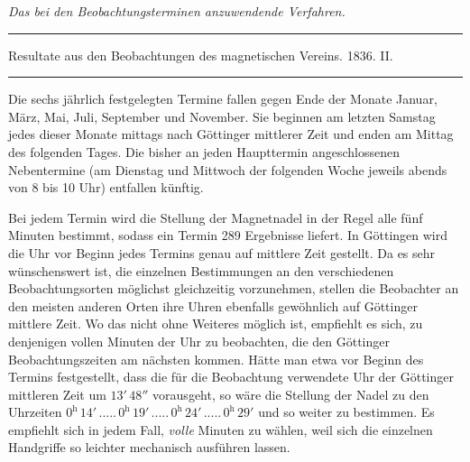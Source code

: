 \begin{center}
{\large\itshape Das bei den Beobachtungsterminen anzuwendende Verfahren.\par}
\vspace{5mm}\hrule\vspace{2mm}
{\small Resultate aus den Beobachtungen des magnetischen Vereins. 1836. II.\par}
\vspace{2mm}\hrule\vspace{5mm}
\end{center}
Die sechs jährlich festgelegten Termine fallen gegen Ende der Monate Januar, März, Mai, Juli, September und November. Sie beginnen am letzten Samstag jedes dieser Monate mittags nach Göttinger mittlerer Zeit und enden am Mittag des folgenden Tages. Die bisher an jeden Haupttermin angeschlossenen Nebentermine (am Dienstag und Mittwoch der folgenden Woche jeweils abends von 8 bis 10 Uhr) entfallen künftig.

Bei jedem Termin wird die Stellung der Magnetnadel in der Regel alle fünf Minuten bestimmt, sodass ein Termin 289 Ergebnisse liefert. In Göttingen wird die Uhr vor Beginn jedes Termins genau auf mittlere Zeit gestellt. Da es sehr wünschenswert ist, die einzelnen Bestimmungen an den verschiedenen Beobachtungsorten möglichst gleichzeitig vorzunehmen, stellen die Beobachter an den meisten anderen Orten ihre Uhren ebenfalls gewöhnlich auf Göttinger mittlere Zeit. Wo das nicht ohne Weiteres möglich ist, empfiehlt es sich, zu denjenigen vollen Minuten der Uhr zu beobachten, die den Göttinger Beobachtungszeiten am nächsten kommen. Hätte man etwa vor
Beginn des Termins festgestellt, dass die für die Beobachtung verwendete Uhr der Göttinger mittleren Zeit um $13'\,48''$ vorausgeht, so wäre die Stellung der Nadel zu den Uhrzeiten $0^{\mathrm h}\,14'\,.....\,0^{\mathrm h}\,19'\,.....\,0^{\mathrm h}\,24'\,.....\,0^{\mathrm h}\,29'$ und so weiter zu bestimmen. Es empfiehlt sich in jedem Fall, \textit{volle} Minuten zu wählen, weil sich die einzelnen Handgriffe so leichter mechanisch ausführen lassen.

